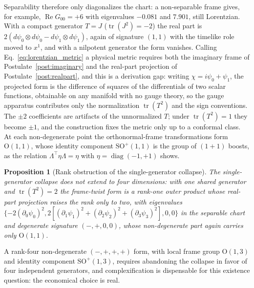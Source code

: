 \documentclass[11pt]{article}
\newtheorem{proposition}{Proposition}
\begin{document}
Separability therefore only diagonalizes the chart: a non-separable frame gives, for example, $\operatorname{Re}G_{00} = +6$ with eigenvalues $-0.081$ and $7.901$, still Lorentzian. With a compact generator $T = J$ ($\operatorname{tr}(J^2) = -2$) the real part is $2(d\psi_0 \otimes d\psi_0 - d\psi_1 \otimes d\psi_1)$, again of signature $(1,1)$ with the timelike role moved to $x^1$, and with a nilpotent generator the form vanishes. Calling Eq.~\eqref{eq:lorentzian_metric} a physical metric requires both the imaginary frame of Postulate~\ref{post:imaginary} and the real-part projection of Postulate~\ref{post:realpart}, and this is a derivation gap: writing $\chi = i\psi_0 + \psi_1$, the projected form is the difference of squares of the differentials of two scalar functions, obtainable on any manifold with no gauge theory, so the gauge apparatus contributes only the normalization $\operatorname{tr}(T^2)$ and the sign conventions. The $\pm 2$ coefficients are artifacts of the unnormalized $T$; under $\operatorname{tr}(T^2) = 1$ they become $\pm 1$, and the construction fixes the metric only up to a conformal class. At each non-degenerate point the orthonormal-frame transformations form $\mathrm{O}(1,1)$, whose identity component $\mathrm{SO}^+(1,1)$ is the group of $(1{+}1)$ boosts, as the relation $\Lambda^\top\eta\Lambda = \eta$ with $\eta = \operatorname{diag}(-1,+1)$ shows.

\begin{proposition}[Rank obstruction of the single-generator collapse]\label{prop:rank_obstruction}
The single-generator collapse does not extend to four dimensions: with one shared generator and $\operatorname{tr}(T^2) = 2$ the frame-twist form is a rank-one outer product whose real-part projection raises the rank only to two, with eigenvalues $\{-2(\partial_0\psi_0)^2, 2[(\partial_1\psi_1)^2 + (\partial_2\psi_2)^2 + (\partial_3\psi_3)^2], 0, 0\}$ in the separable chart and degenerate signature $(-,+,0,0)$, whose non-degenerate part again carries only $\mathrm{O}(1,1)$.
\end{proposition}

A rank-four non-degenerate $(-,+,+,+)$ form, with local frame group $\mathrm{O}(1,3)$ and identity component $\mathrm{SO}^+(1,3)$, requires abandoning the collapse in favor of four independent generators, and complexification is dispensable for this existence question: the economical choice is real.
\end{document}
